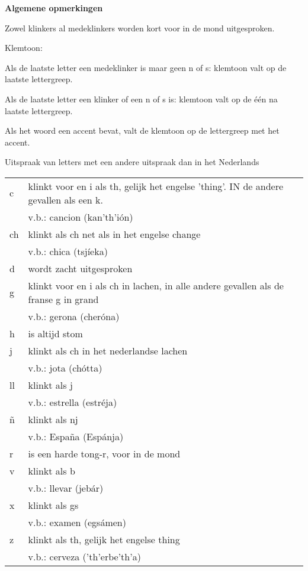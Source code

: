 \vspace{-20pt}
\textbf{Algemene opmerkingen}
\vspace{-12pt}
\begin{compactenum}
\item Zowel klinkers al medeklinkers worden kort voor in de mond uitgesproken.
\item Klemtoon:
\begin{compactenum}
\item Als de laatste letter een medeklinker is maar geen n of s: klemtoon valt op de laatste lettergreep.
\item Als de laatste letter een klinker of een n of s is: klemtoon valt op de \'e\'en na laatste lettergreep.
\item Als het woord een accent bevat, valt de klemtoon op de lettergreep met het accent.
\end{compactenum}
\end{compactenum}

Uitspraak van letters met een andere uitspraak dan in het Nederlands\\
\begin{tabularx}{1.0\textwidth}{l l}
c & klinkt voor en i als th, gelijk het engelse 'thing'. IN de andere gevallen als een k.\\
 & v.b.: cancion (kan'th'i\'on)\\
ch & klinkt als ch net als in het engelse change\\
 & v.b.: chica (tsj\'ieka)\\
d & wordt zacht uitgesproken\\
g & klinkt voor en i als ch in lachen, in alle andere gevallen als de franse g in grand\\
 & v.b.: gerona (cher\'ona)\\
h & is altijd stom\\
j & klinkt als ch in het nederlandse lachen\\
 & v.b.: jota (ch\'otta)\\
ll & klinkt als j\\
 & v.b.: estrella (estr\'eja)\\
\~{n} & klinkt als nj\\
 & v.b.: Espa\~na (Esp\'anja)\\
r & is een harde tong-r, voor in de mond\\
v & klinkt als b\\
 & v.b.: llevar (jeb\'ar)\\
x & klinkt als gs\\
 & v.b.: examen (egs\'amen)\\
z & klinkt als th, gelijk het engelse thing\\
 & v.b.: cerveza ('th'erbe'th'a)\\
\end{tabularx}

